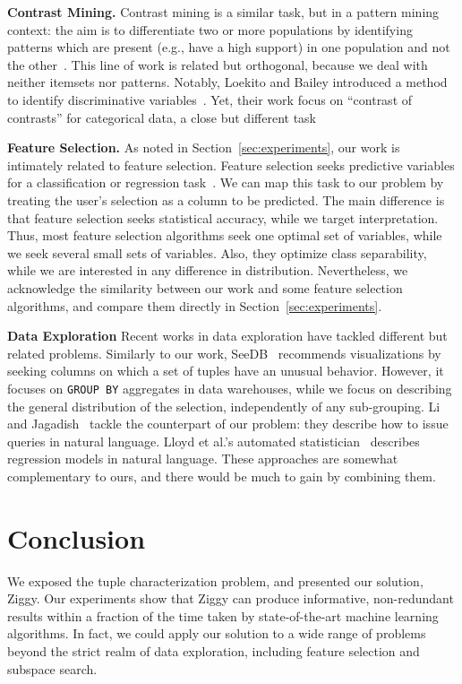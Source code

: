 \textbf{Contrast Mining.} Contrast mining is a similar task, but in a pattern
mining context: the aim is to differentiate two or more populations by
identifying patterns which are present (e.g., have a high support) in one
population and not the
other~\cite{vreeken2007characterising,webb2008detecting}. This line of work is
related but orthogonal, because we deal with neither itemsets nor patterns.
Notably, Loekito and Bailey introduced a  method to identify discriminative 
variables~\cite{loekito2008mining}.  Yet, their work focus on ``contrast of
contrasts'' for categorical data, a close but different task

\textbf{Feature Selection.} As noted in Section~\ref{sec:experiments}, our work
is intimately related to feature selection. Feature selection seeks predictive
variables for a classification or regression task~\cite{guyon2003introduction}.
We can map this task to our problem by treating the user's selection as a
column to be predicted. The main difference is that feature selection seeks
statistical accuracy, while we target interpretation. Thus, most feature
selection algorithms seek one optimal set of variables, while we seek several
small sets of variables. Also, they optimize class separability,
while we are interested in any difference in distribution. Nevertheless, we
acknowledge the similarity between our work and some feature selection
algorithms, and compare them directly in Section~\ref{sec:experiments}.

\textbf{Data Exploration} Recent works in data exploration have tackled
different but related problems. Similarly to our work,
SeeDB~\cite{vartak2015see} re\-com\-mends visualizations by seeking co\-lumns
on which a set of tuples have an unusual behavior. However, it focuses on
\texttt{GROUP BY} aggregates in data warehouses, while we focus on describing
the general distribution of the selection, independently of any sub-grouping.
Li and Jagadish~\cite{li2014constructing} tackle the counterpart of our
problem: they describe how to issue queries in natural language. Lloyd et al.'s
automated statistician~\cite{Lloyd2014ABCD} describes regression models in
natural language. These approaches are somewhat complementary to ours, and
there would be much to gain by combining them.


\section{Conclusion}
\label{sec:conclusions}
We exposed the tuple characterization problem, and presented our solution,
Ziggy. Our experiments show that Ziggy can produce informative, non-redundant
results within a fraction of the time taken by state-of-the-art machine
learning algorithms. In fact,  we could apply our solution to a wide range of
problems beyond the strict realm of data exploration, including feature
selection and subspace search.

